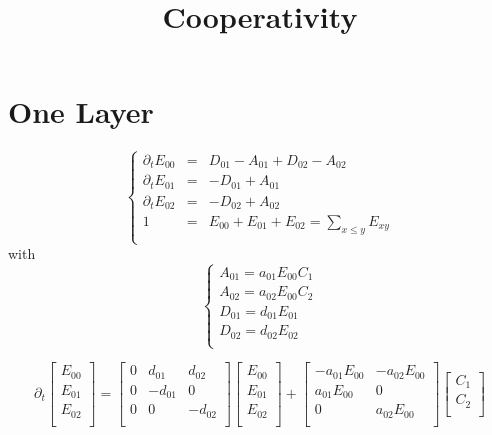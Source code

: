 \documentclass[aps,onecolumn,12pt]{revtex4}
\begin{document}
\title{Cooperativity}
\maketitle

\section{One Layer}

\begin{equation}
\left\lbrace
\begin{array}{rcl}
\partial_t E_{00} & = & D_{01}-A_{01} + D_{02}-A_{02}\\
\partial_t E_{01} & = & -D_{01}+A_{01}\\
\partial_t E_{02} & = & -D_{02}+A_{02}\\
1                 & = & E_{00}+E_{01}+E_{02} = \sum_{x\leq y} E_{xy}\\
\end{array}
\right.
\end{equation}
with
\begin{equation}
\left\lbrace
\begin{array}{rcl}
A_{01} = a_{01} E_{00} C_1\\
A_{02} = a_{02} E_{00} C_2\\
D_{01} = d_{01} E_{01}\\
D_{02} = d_{02} E_{02}\\
\end{array}
\right.
\end{equation}

\begin{equation}
\partial_t
\begin{bmatrix}
E_{00}\\
E_{01}\\
E_{02}\\
\end{bmatrix}
=
\begin{bmatrix}
0 & d_{01} & d_{02}\\
0 & -d_{01} & 0\\
0 & 0 & -d_{02}\\
\end{bmatrix}
\begin{bmatrix}
E_{00}\\
E_{01}\\
E_{02}\\
\end{bmatrix}
+
\begin{bmatrix}
-a_{01}E_{00} & - a_{02} E_{00}\\
a_{01} E_{00} & 0 \\
0 & a_{02} E_{00} \\
\end{bmatrix}
\begin{bmatrix}
C_1\\
C_2\\
\end{bmatrix}
\end{equation}
\end{document}
